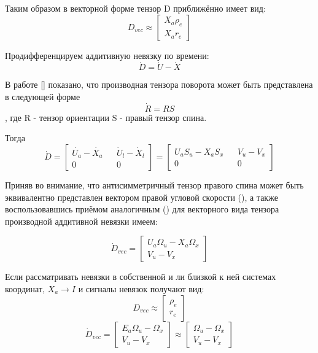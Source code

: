 \documentclass[a4paper]{article}
\begin{document}
Таким образом в векторной форме тензор D приближённо имеет вид:
\begin{equation} D_{vec} \approx \begin{bmatrix}X_a\rho_e\\X_ar_e\end{bmatrix} \end{equation}

Продифференцируем аддитивную невязку по времени:
\begin{equation} \dot{D} = \dot{U} -\dot{X} \end{equation}

В работе [] показано, что производная тензора поворота может быть представлена в следующей форме
\begin{equation} \dot{R} = R S \end{equation}
, где R - тензор ориентации S - правый тензор спина.

Тогда 
\begin{equation} 
\dot{D} = \begin{bmatrix}\dot{U_a} - \dot{X_a}&&\dot{U}_l-\dot{X}_l\\0&&0\end{bmatrix} 
= \begin{bmatrix}U_aS_u - X_aS_x&&V_u-V_x\\0&&0\end{bmatrix}\end{equation}

Приняв во внимание, что антисимметричный тензор правого спина может быть эквивалентно представлен вектором правой угловой скорости (), а также воспользовавшись приёмом аналогичным () для векторного вида тензора производной аддитивной невязки имеем:

\begin{equation}\dot{D}_{vec} = \begin{bmatrix}U_a\Omega_u-X_a\Omega_x\\ V_u-V_x\end{bmatrix}\end{equation}

Если рассматривать невязки в собственной и ли близкой к ней системах координат, $X_a\rightarrow I$ и сигналы невязок получают вид:
\begin{equation} D_{vec} \approx \begin{bmatrix}\rho_e\\r_e\end{bmatrix} \end{equation}
\begin{equation}\dot{D}_{vec} = \begin{bmatrix}E_a\Omega_u-\Omega_x\\ V_u-V_x\end{bmatrix}
\approx\begin{bmatrix}\Omega_u-\Omega_x\\ V_u-V_x\end{bmatrix}
\end{equation}
\end{document}

